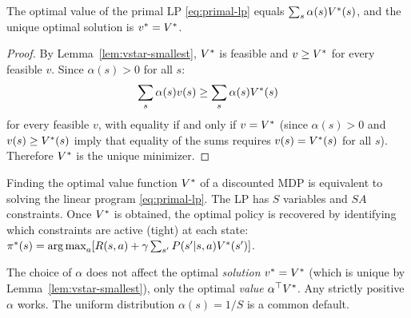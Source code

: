 \documentclass[11pt,a4paper]{article}
\begin{document}
\begin{theorem}
\label{thm:primal-optimal}
The optimal value of the primal LP \eqref{eq:primal-lp} equals
$\sum_s \alpha(s) V^*(s)$, and the unique optimal solution is
$v^* = V^*$.
\end{theorem}

\begin{proof}
By Lemma~\ref{lem:vstar-smallest}, $V^*$ is feasible and
$v \geq V^*$ for every feasible $v$. Since $\alpha(s) > 0$
for all $s$:
\[
    \sum_s \alpha(s) v(s) \geq \sum_s \alpha(s) V^*(s)
\]
for every feasible $v$, with equality if and only if $v = V^*$
(since $\alpha(s) > 0$ and $v(s) \geq V^*(s)$ imply that
equality of the sums requires $v(s) = V^*(s)$ for all $s$).
Therefore $V^*$ is the unique minimizer.
\end{proof}

\begin{keyresult}[title={MDP as a Linear Program}]
\label{kr:mdp-lp}
Finding the optimal value function $V^*$ of a discounted MDP
is equivalent to solving the linear program \eqref{eq:primal-lp}.
The LP has $S$ variables and $SA$ constraints. Once $V^*$ is
obtained, the optimal policy is recovered by identifying which
constraints are active (tight) at each state: $\pi^*(s) =
\operatorname{arg\,max}_a [R(s,a) + \gamma \sum_{s'} P(s'|s,a) V^*(s')]$.
\end{keyresult}

\begin{remark}
\label{rem:alpha-choice}
The choice of $\alpha$ does not affect the optimal \emph{solution}
$v^* = V^*$ (which is unique by Lemma~\ref{lem:vstar-smallest}),
only the optimal \emph{value} $\alpha^\top V^*$. Any strictly
positive $\alpha$ works. The uniform distribution
$\alpha(s) = 1/S$ is a common default.
\end{remark}
\end{document}
